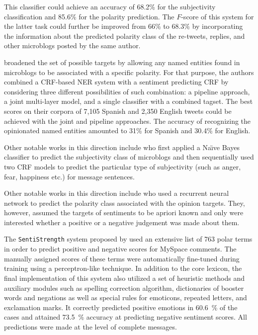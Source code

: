 This classifier could achieve an accuracy of 68.2\% for the
subjectivity classification and 85.6\% for the polarity prediction.
The $F$-score of this system for the latter task could further be
improved from 66\% to 68.3\% by incorporating the information about
the predicted polarity class of the re-tweets, replies, and other
microblogs posted by the same author.

\citet{Mitchell:13} broadened the set of possible targets by allowing
any named entities found in microblogs to be associated with a
specific polarity.  For that purpose, the authors combined a CRF-based
NER system with a sentiment predicting CRF by considering three
different possibilities of such combination: a pipeline approach, a
joint multi-layer model, and a single classifier with a combined
tagset.  The best scores on their corpora of 7,105 Spanish and 2,350
English tweets could be achieved with the joint and pipeline
approaches.  The accuracy of recognizing the opinionated named
entities amounted to 31\% for Spanish and 30.4\% for English.

Other notable works in this direction include \citet{Chunping:14} who
first applied a Na\"{\i}ve Bayes classifier to predict the
subjectivity class of microblogs and then sequentially used two CRF
models to predict the particular type of subjectivity (such as anger,
fear, happiness etc.) for message sentences.

Other notable works in this direction include \citet{Dong:14} who used
a recurrent neural network to predict the polarity class associated
with the opinion targets.  They, however, assumed the targets of
sentiments to be apriori known and only were interested whether a
positive or a negative judgement was made about them.

\citet{Derks:08}

The \texttt{SentiStrength} system proposed by \cite{Thelwall:12} used
an extensive list of 763 polar terms in order to predict positive and
negative scores for MySpace comments.  The manually assigned scores of
these terms were automatically fine-tuned during training using a
perceptron-like technique.  In addition to the core lexicon, the final
implementation of this system also utilized a set of heuristic methods
and auxiliary modules such as spelling correction algorithm,
dictionaries of booster words and negations as well as special rules
for emoticons, repeated letters, and exclamation marks.  It correctly
predicted positive emotions in 60.6~\% of the cases and attained
73.5~\% accuracy at predicting negative sentiment scores.  All
predictions were made at the level of complete messages.

